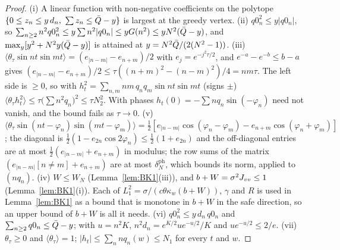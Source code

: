 \begin{proof}
(i) A linear function with non-negative coefficients on the polytope $\{0\le z_n\le y\,d_n,\ \sum z_n\le\bar Q-y\}$ is largest at the greedy vertex.
(ii) $q0_n^2\le y|q0_n|$, so $\sum_{n\ge2}n^2q0_n^2\le y\sum n^2|q0_n|\le yG(n^2)\le yN^2(\bar Q-y)$, and
$\max_y[y^2+N^2y(\bar Q-y)]$ is attained at $y=N^2\bar Q/(2(N^2-1))$.
(iii) $\langle\theta_\tau\sin nt\sin mt\rangle=(e_{|n-m|}-e_{n+m})/2$ with $e_j=e^{-j^2\tau/2}$, and $e^{-a}-e^{-b}\le b-a$ gives
$(e_{|n-m|}-e_{n+m})/2\le\tau((n+m)^2-(n-m)^2)/4=nm\tau$. The left side is $\ge0$, so with $h_t^2=\sum_{n,m}nm\,q_nq_m\sin nt\sin mt$ (signs $\pm$)
$\langle\theta_\tau h_t^2\rangle\le\tau\big(\sum n^2q_n\big)^2\le\tau N_2^2$. With phases $h_t(0)=-\sum nq_n\sin(-\varphi_n)$ need not vanish, and the bound fails as $\tau\to0$.
(v) $\langle\theta_\tau\sin(nt-\varphi_n)\sin(mt-\varphi_m)\rangle=\frac12[e_{|n-m|}\cos(\varphi_n-\varphi_m)-e_{n+m}\cos(\varphi_n+\varphi_m)]$; the diagonal is
$\frac12(1-e_{2n}\cos2\varphi_n)\le\frac12(1+e_{2n})$ and the off-diagonal entries are at most $\frac12(e_{|n-m|}+e_{n+m})$ in modulus; the row sums of the
matrix $(e_{|n-m|}[n\ne m]+e_{n+m})$ are at most $\delta_N^{\mathrm{ph}}$, which bounds its norm, applied to $(nq_n)$.
(iv) $W\le W_N$ (Lemma~\ref{lem:BK1}(iii)), and $b+W=\sigma^2J_{vv}\le1$ (Lemma~\ref{lem:BK1}(i)). Each of $L_1^2=\sigma/(c\theta\kappa_w(b+W))$, $\gamma$ and $R$ is
used in Lemma~\ref{lem:BK1} as a bound that is monotone in $b+W$ in the safe direction, so an upper bound of $b+W$ is all it needs.
(vi) $q0_n^2\le y\,d_n\,q0_n$ and $\sum_{n\ge2}q0_n\le\bar Q-y$; with $u=n^2K$, $n^2d_n=e^{K/2}ue^{-u/2}/K$ and $ue^{-u/2}\le2/e$.
(vii) $\theta_\tau\ge0$ and $\langle\theta_\tau\rangle=1$; $|h_t|\le\sum_nnq_n(w)\le N_1$ for every $t$ and $w$.
\end{proof}

